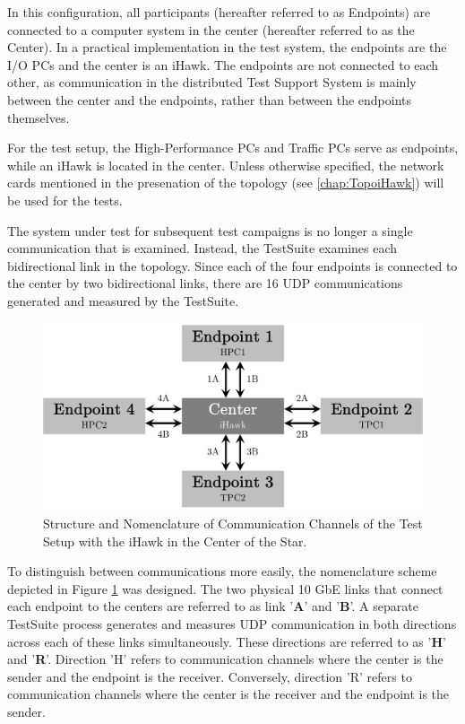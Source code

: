 In this configuration, all participants (hereafter referred to as Endpoints) are connected to a computer system in the center (hereafter referred to as the Center). In a practical implementation in the test system, the endpoints are the I/O PCs and the center is an iHawk. The endpoints are not connected to each other, as communication in the distributed Test Support System is mainly between the center and the endpoints, rather than between the endpoints themselves.

For the test setup, the High-Performance PCs and Traffic PCs serve as endpoints, while an iHawk is located in the center. Unless otherwise specified, the network cards mentioned in the presenation of the topology (see \ref{chap:TopoiHawk}) will be used for the tests.

The system under test for subsequent test campaigns is no longer a single communication that is examined. Instead, the TestSuite examines each bidirectional link in the topology. Since each of the four endpoints is connected to the center by two bidirectional links, there are 16 UDP communications generated and measured by the TestSuite.

\begin{figure}[h!]
    \centering
    \includegraphics[width=0.8\linewidth]{figures/reliability/ihawk/topo.pdf}
    \caption{Structure and Nomenclature of Communication Channels of the Test Setup with the iHawk in the Center of the Star.}
    \label{fig:topoihawknaming}
\end{figure}

To distinguish between communications more easily, the nomenclature scheme depicted in Figure \ref{fig:topoihawknaming} was designed. The two physical 10 GbE links that connect each endpoint to the centers are referred to as link '\textbf{A}' and '\textbf{B}'. A separate TestSuite process generates and measures UDP communication in both directions across each of these links simultaneously. These directions are referred to as '\textbf{H}' and '\textbf{R}'. Direction 'H' refers to communication channels where the center is the sender and the endpoint is the receiver. Conversely, direction 'R' refers to communication channels where the center is the receiver and the endpoint is the sender.

